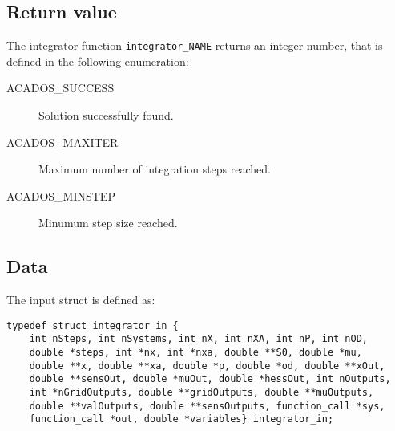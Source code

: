 \documentclass{report}
\begin{document}
\subsection{Return value}
The integrator function \texttt{integrator\_NAME} returns an integer number, that is defined in the following enumeration:
\begin{description}
	\item[ACADOS\_SUCCESS] Solution successfully found.
	\item[ACADOS\_MAXITER] Maximum number of integration steps reached.
	\item[ACADOS\_MINSTEP] Minumum step size reached.
\end{description}

\subsection{Data}
The input struct is defined as:
\begin{verbatim}
typedef struct integrator_in_{
    int nSteps, int nSystems, int nX, int nXA, int nP, int nOD, 
    double *steps, int *nx, int *nxa, double **S0, double *mu,
    double **x, double **xa, double *p, double *od, double **xOut, 
    double **sensOut, double *muOut, double *hessOut, int nOutputs,
    int *nGridOutputs, double **gridOutputs, double **muOutputs, 
    double **valOutputs, double **sensOutputs, function_call *sys, 
    function_call *out, double *variables} integrator_in;
\end{verbatim}
\end{document}
